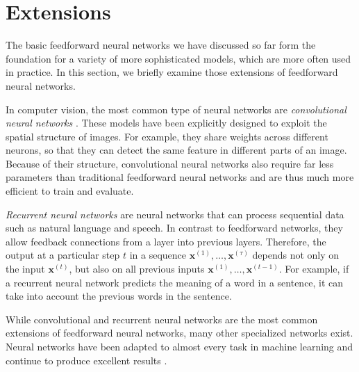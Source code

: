 \section{Extensions}
\label{sec:extensions}
The basic feedforward neural networks we have discussed so far form the foundation for a variety of more sophisticated models, which are more often used in practice. In this section, we briefly examine those extensions of feedforward neural networks.

In computer vision, the most common type of neural networks are \emph{convolutional neural networks} \cite{LeCun1989}. These models have been explicitly designed to exploit the spatial structure of images. For example, they share weights across different neurons, so that they can detect the same feature in different parts of an image. Because of their structure, convolutional neural networks also require far less parameters than traditional feedforward neural networks and are thus much more efficient to train and evaluate.

\emph{Recurrent neural networks} \cite{Rumelhart1986533} are neural networks that can process sequential data such as natural language and speech. In contrast to feedforward networks, they allow feedback connections from a layer into previous layers. Therefore, the output at a particular step $t$ in a sequence $\bm{x}^{(1)}, \ldots, \bm{x}^{(\tau)}$ depends not only on the input $\bm{x}^{(t)}$, but also on all previous inputs $\bm{x}^{(1)}, \ldots, \bm{x}^{(t-1)}$. For example, if a recurrent neural network predicts the meaning of a word in a sentence, it can take into account the previous words in the sentence.

While convolutional and recurrent neural networks are the most common extensions of feedforward neural networks, many other specialized networks exist. Neural networks have been adapted to almost every task in machine learning and continue to produce excellent results \cite[Ch.\,5,\,pp.\,96-100]{DBLP:books/daglib/0040158}.